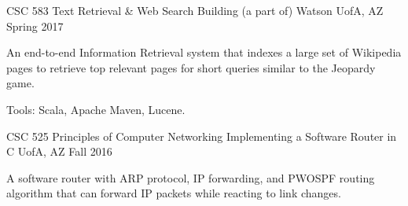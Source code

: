 \begin{cventries}
  \cventry
    {CSC 583 Text Retrieval \& Web Search} %
    {Building (a part of) Watson} %
    {UofA, AZ} %
    {Spring 2017} %
    {
      \begin{cvitems} %
        \item {An end-to-end Information Retrieval system that indexes a large set of Wikipedia pages to retrieve top relevant pages for short queries similar to the Jeopardy game.}
        \item {Tools: Scala, Apache Maven, Lucene.}
      \end{cvitems}
    }
    {}

  \cventry
    {CSC 525 Principles of Computer Networking} %
    {Implementing a Software Router in C} %
    {UofA, AZ} %
    {Fall 2016} %
    {
      \begin{cvitems} %
        \item {A software router with ARP protocol, IP forwarding, and PWOSPF routing algorithm that can forward IP packets while reacting to link changes.}
      \end{cvitems}
    }
    {}


\end{cventries}
